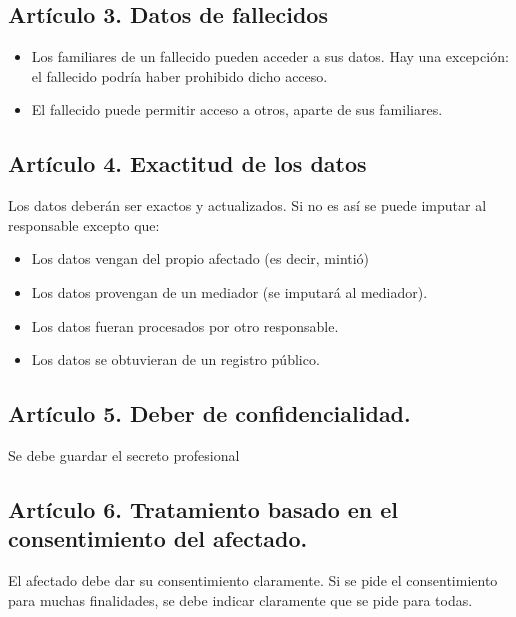 \documentclass[letterpaper,10pt,spanish]{sphinxmanual}
\begin{document}
\subsection{Artículo 3. Datos de fallecidos}
\label{\detokenize{tema_lopd/tema_lopd:articulo-3-datos-de-fallecidos}}\begin{itemize}
\item {} 
Los familiares de un fallecido pueden acceder a sus datos. Hay una excepción: el fallecido podría haber prohibido dicho acceso.

\item {} 
El fallecido puede permitir acceso a otros, aparte de sus familiares.

\end{itemize}


\subsection{Artículo 4. Exactitud de los datos}
\label{\detokenize{tema_lopd/tema_lopd:articulo-4-exactitud-de-los-datos}}
Los datos deberán ser exactos y actualizados. Si no es así se puede imputar al responsable excepto que:
\begin{itemize}
\item {} 
Los datos vengan del propio afectado (es decir, mintió)

\item {} 
Los datos provengan de un mediador (se imputará al mediador).

\item {} 
Los datos fueran procesados por otro responsable.

\item {} 
Los datos se obtuvieran de un registro público.

\end{itemize}


\subsection{Artículo 5. Deber de confidencialidad.}
\label{\detokenize{tema_lopd/tema_lopd:articulo-5-deber-de-confidencialidad}}
Se debe guardar el secreto profesional 


\subsection{Artículo 6. Tratamiento basado en el consentimiento del afectado.}
\label{\detokenize{tema_lopd/tema_lopd:articulo-6-tratamiento-basado-en-el-consentimiento-del-afectado}}
El afectado debe dar su consentimiento claramente. Si se pide el consentimiento para muchas finalidades, se debe indicar claramente que se pide para todas. 
\end{document}

